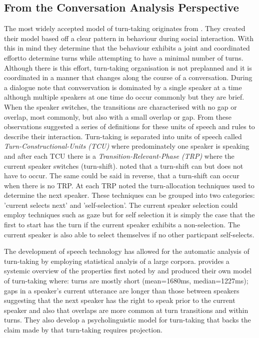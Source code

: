 \documentclass[logo,bsc,singlespacing,parskip]{infthesis}
\begin{document}
\subsection{From the Conversation Analysis Perspective}
The most widely accepted model of turn-taking originates from \cite{Sacks1974}. They created their model based off a clear pattern in behaviour during social interaction. With this in mind they determine that the behaviour exhibits a joint and coordinated effortto determine turns while attempting to have a minimal number of turns. Although there is this effort, turn-taking organisation is not preplanned and it is coordinated in a manner that changes along the course of a conversation. During a dialogue \cite{Sacks1974} note that convservation is dominated by a single speaker at a time although multiple speakers at one time do occur commonly but they are brief. When the speaker switches, the transitions are characterised with no gap or overlap, most commonly, but also with a small overlap or gap. From these observations \cite{Sacks1974} suggested a series of definitions for these units of speech and rules to describe their interaction. Turn-taking is separated into units of speech called \textit{Turn-Constructional-Units (TCU)} where predominately one speaker is speaking and after each TCU there is a \textit{Transition-Relevant-Phase (TRP)} where the current speaker switches (turn-shift). 
\cite{Sacks1974} noted that a turn-shift can but does not have to occur. The same could be said in reverse, that a turn-shift can occur when there is no TRP. At each TRP  \cite{Sacks1974} noted the turn-allocation techniques used to determine the next speaker. These techniques can be grouped into two categories: 'current selects next' and 'self-selection'. The current speaker selection could employ techniques such as gaze but for self selection it is simply the case that the first to start has the turn if the current speaker exhibits a non-selection. The current speaker is also able to select themselves if no other particpant self-selects. 

The development of speech technology has allowed for the automatic analysis of turn-taking by employing statistical analyis of a large corpora. \cite{LevTor2015} provides a systemic overview of the properties first noted by \cite{Sacks1974} and produced their own model of turn-taking where: turns are mostly short (mean=1680ms, median=1227ms); gaps in a speaker's current utterance are longer than those between speakers suggesting that the next speaker has the right to speak prior to the current speaker and also that overlaps are more common at turn transitions and within turns. They also develop a psycholinguistic model for turn-taking that backs the claim made by \cite{Sacks1974} that turn-taking requires projection. 
\end{document}
